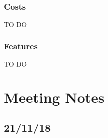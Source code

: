 \documentclass[11pt,a4paper]{report}
\begin{document}
\subsection{Costs}
\label{subsec:costs}

TO DO


\subsection{Features}
\label{subsec:features}

TO DO


\chapter{Meeting Notes}

\section{21/11/18}
\end{document}
